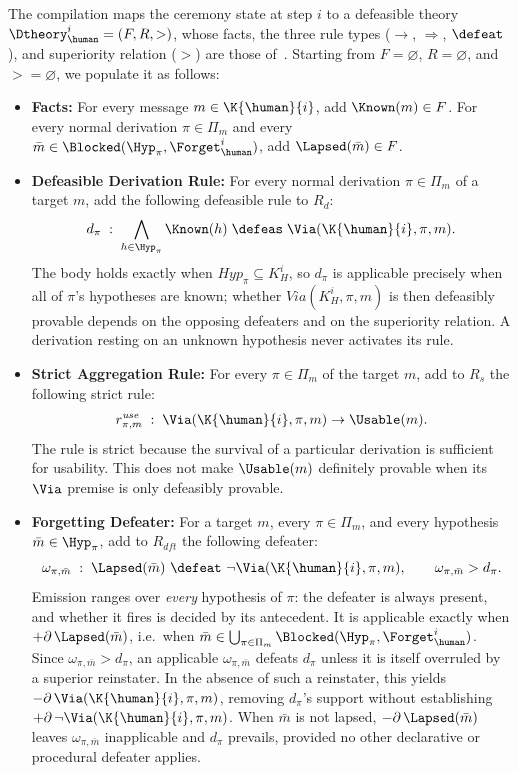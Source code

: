 \label{subsec:compilation}
The compilation maps the ceremony state at step $i$ to a defeasible theory $\Dtheory_{\human}^i=(F,R,{>})$, whose facts, the three rule types ($\rightarrow$, $\Rightarrow$, $\defeat$), and superiority relation (${>}$) are those of~.
Starting from $F=\varnothing$, $R=\varnothing$, and ${>}=\varnothing$, we populate it as follows:
\begin{itemize}
    \item \textbf{Facts:} For every message $m \in \K{\human}{i}$, add $\Known(m) \in F$. For every normal derivation $\pi\in\Pi_{m}$ and every $\bar m \in\Blocked(\Hyp_\pi,\Forget_{\human}^{i})$, add $\Lapsed(\bar m)\in F$.
    \item \textbf{Defeasible Derivation Rule:} For every normal derivation $\pi\in\Pi_m$ of a target $m$, add the following defeasible rule to $R_d$:
    \[
        d_\pi \;:\; \bigwedge_{h \in \Hyp_\pi}\Known(h)\;\defeas\;\Via(\K{\human}{i},\pi,m).
    \]
    The body holds exactly when $\mathit{Hyp}_\pi\subseteq K^i_H$, so $d_\pi$ is applicable precisely when all of $\pi$'s hypotheses are known; whether $\mathit{Via}(K^i_H,\pi,m)$ is then defeasibly provable depends on the opposing defeaters and on the superiority relation. A derivation resting on an unknown hypothesis never activates its rule.
    \item \textbf{Strict Aggregation Rule:} For every $\pi\in\Pi_m$ of the target $m$, add to $R_s$ the following strict rule:
    \[
        r^{\mathit{use}}_{\pi,m} \;:\; \Via(\K{\human}{i}, \pi, m) \to \Usable(m).
    \]
    The rule is strict because the survival of a particular derivation is sufficient for usability. This does not make $\Usable(m)$ definitely provable when its $\Via$ premise is only defeasibly provable.

    \item \textbf{Forgetting Defeater:} For a target $m$, every $\pi\in\Pi_m$, and every hypothesis $\bar m \in \Hyp_\pi$, add to $R_{\mathit{dft}}$ the following defeater:
    \[
        \omega_{\pi,\bar m} \;:\; \Lapsed(\bar m) \ \defeat\ \neg\Via(\K{\human}{i}, \pi, m),
        \qquad \omega_{\pi,\bar m} > d_\pi .
    \]
    Emission ranges over \emph{every} hypothesis of $\pi$: the defeater is always present, and whether it fires is decided by its antecedent. It is applicable exactly when $+\partial\,\Lapsed(\bar m)$, i.e.\ when $\bar m \in \bigcup_{\pi\in\Pi_m}\Blocked(\Hyp_\pi, \Forget_\human^{i})$. Since $\omega_{\pi,\bar m}>d_\pi$, an applicable $\omega_{\pi,\bar m}$ defeats $d_\pi$ unless it is itself overruled by a superior reinstater. In the absence of such a reinstater, this yields $-\partial\,\Via(\K{\human}{i},\pi,m)$, removing $d_\pi$'s support without establishing $+\partial\,\neg\Via(\K{\human}{i},\pi,m)$. When $\bar m$ is not lapsed, $-\partial\,\Lapsed(\bar m)$ leaves $\omega_{\pi,\bar m}$ inapplicable and $d_\pi$ prevails, provided no other declarative or procedural defeater applies.
    \end{itemize}

